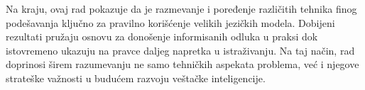 \documentclass[12pt,oneside]{memoir}
\begin{document}
Na kraju, ovaj rad pokazuje da je razmevanje i poređenje različitih tehnika finog podešavanja ključno za pravilno korišćenje velikih jezičkih modela. Dobijeni rezultati pružaju osnovu za donošenje informisanih odluka u praksi dok istovremeno ukazuju na pravce daljeg napretka u istraživanju. Na taj način, rad doprinosi širem razumevanju ne samo tehničkih aspekata problema, već i njegove strateške važnosti u budućem razvoju veštačke inteligencije.







\backmatter
\end{document}
